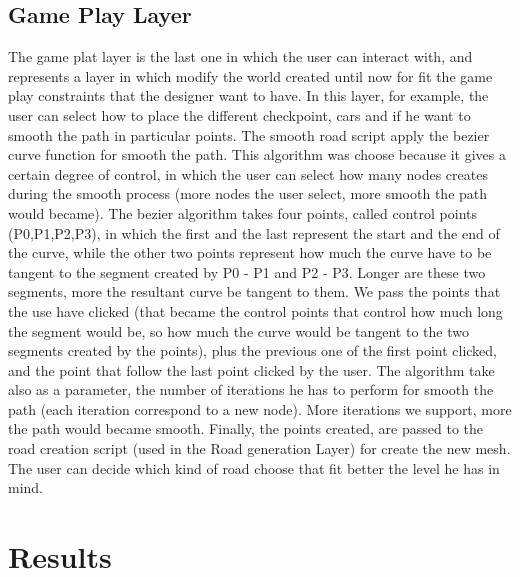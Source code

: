 \documentclass[conference]{IEEEtran}
\begin{document}
\subsection{Game Play Layer}

The game plat layer is the last one in which the user can interact with, and represents a layer in which modify the world created until now for fit the game play constraints that the designer want to have. In this layer, for example,  the user can select how to place the different checkpoint, cars and if he want to smooth the path in particular points. \newline
The smooth road script apply the bezier curve function for smooth the path. This algorithm was choose because it gives a certain degree of control, in which the user can select how many nodes creates during the smooth process (more nodes the user select, more smooth the path would became). The bezier algorithm takes four points, called control points (P0,P1,P2,P3), in which the first and the last represent the start and the end of the curve, while the other two points represent how much the curve have to be tangent to the segment created by P0 - P1 and P2 - P3. Longer are these two segments, more the resultant curve be tangent to them.  We pass the points that the use have clicked (that became the control points that control how much long the segment would be, so how much the curve would be tangent to the two segments created by the points), plus the previous one of the first point clicked, and the  point that follow the last point clicked by the user. The algorithm take also as a parameter, the number of iterations he has to perform for smooth the path (each iteration correspond to a new node). More iterations we support, more the path would became smooth. Finally, the points created, are passed to the road creation script (used in the Road generation Layer) for create the new mesh.\newline
The user can decide which kind of road choose that fit better the level he has in mind.

\section{Results}
\end{document}
